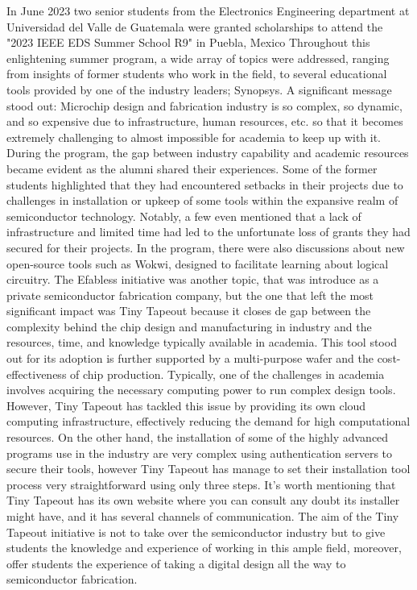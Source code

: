 In June 2023 two senior students from the Electronics Engineering department at Universidad del Valle de Guatemala were granted scholarships to attend the "2023 IEEE EDS Summer School R9" in Puebla, Mexico
Throughout this enlightening summer program, a wide array of topics were addressed, ranging from insights of former students who work in the field, to several educational tools provided by one of the industry leaders; Synopsys. A significant message stood out: Microchip design and fabrication industry is so complex, so dynamic, and so expensive due to infrastructure, human resources, etc. so that it becomes extremely challenging to almost impossible for academia to keep up with it.
During the program, the gap between industry capability and academic resources became evident as the alumni shared their experiences. Some of the former students highlighted that they had encountered setbacks in their projects due to challenges in installation or upkeep of some tools within the expansive realm of semiconductor technology. Notably, a few even mentioned that a lack of infrastructure and limited time had led to the unfortunate loss of grants they had secured for their projects.
In the program, there were also discussions about new open-source tools such as Wokwi, designed to facilitate learning about logical circuitry. The Efabless initiative was another topic, that was introduce as a private semiconductor fabrication company, but the one that left the most significant impact was Tiny Tapeout because it closes de gap between the complexity behind the chip design and manufacturing in industry and the resources, time, and knowledge typically available in academia. This tool stood out for its adoption is further supported by a multi-purpose wafer and the cost-effectiveness of chip production. Typically, one of the challenges in academia involves acquiring the necessary computing power to run complex design tools. However, Tiny Tapeout has tackled this issue by providing its own cloud computing infrastructure, effectively reducing the demand for high computational resources. On the other hand, the installation of some of the highly advanced programs use in the industry are very complex using authentication servers to secure their tools, however Tiny Tapeout has manage to set their installation tool process very straightforward using only three steps. It’s worth mentioning that Tiny Tapeout has its own website where you can consult any doubt its installer might have, and it has several channels of communication. The aim of the Tiny Tapeout initiative is not to take over the semiconductor industry but to give students the knowledge and experience of working in this ample field, moreover, offer students the experience of taking a digital design all the way to semiconductor fabrication.
